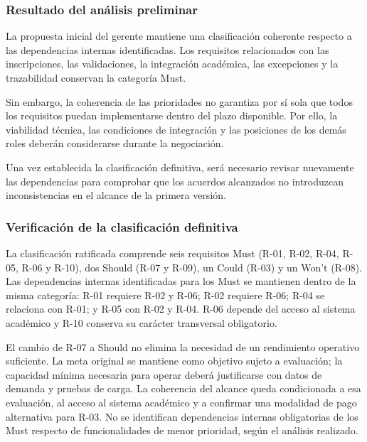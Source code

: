 \documentclass[12pt,a4paper]{article}
\begin{document}
\subsubsection{Resultado del análisis preliminar}

La propuesta inicial del gerente mantiene una
clasificación coherente respecto a las dependencias
internas identificadas. Los requisitos relacionados
con las inscripciones, las validaciones, la integración
académica, las excepciones y la trazabilidad conservan
la categoría Must.

Sin embargo, la coherencia de las prioridades no
garantiza por sí sola que todos los requisitos puedan
implementarse dentro del plazo disponible. Por ello,
la viabilidad técnica, las condiciones de integración
y las posiciones de los demás roles deberán
considerarse durante la negociación.

Una vez establecida la clasificación definitiva,
será necesario revisar nuevamente las dependencias
para comprobar que los acuerdos alcanzados no
introduzcan inconsistencias en el alcance de la
primera versión.

\subsubsection{Verificación de la clasificación definitiva}

La clasificación ratificada comprende seis requisitos Must
(R-01, R-02, R-04, R-05, R-06 y R-10), dos Should
(R-07 y R-09), un Could (R-03) y un Won't (R-08).
Las dependencias internas identificadas para los Must se
mantienen dentro de la misma categoría: R-01 requiere R-02
y R-06; R-02 requiere R-06; R-04 se relaciona con R-01;
y R-05 con R-02 y R-04. R-06 depende del acceso al sistema
académico y R-10 conserva su carácter transversal obligatorio.

El cambio de R-07 a Should no elimina la necesidad de un
rendimiento operativo suficiente. La meta original se mantiene
como objetivo sujeto a evaluación; la capacidad mínima necesaria
para operar deberá justificarse con datos de demanda y pruebas de
carga. La coherencia del alcance queda condicionada a esa evaluación,
al acceso al sistema académico y a confirmar una modalidad de pago
alternativa para R-03. No se identifican dependencias internas
obligatorias de los Must respecto de funcionalidades de menor
prioridad, según el análisis realizado.

\end{document}
